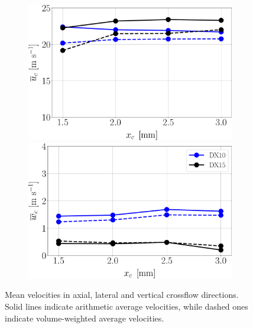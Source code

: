 \begin{figure}[h!]
\flushleft
\begin{subfigure}[b]{1.0\textwidth}
	\flushleft
   \includegraphics[scale=0.25]{./part3_applications/figures_ch8_resolved/SPRAY_characterization/velocities/ux_mean}
   \hspace*{0.2in}
   \includegraphics[scale=0.25]{./part3_applications/figures_ch8_resolved/SPRAY_characterization/velocities/uz_mean}
\end{subfigure}
	\vspace*{-0.2in}
   \caption[Sampled mean liquid velocities for all cases]{Mean velocities in axial, lateral and vertical crossflow directions. Solid lines indicate arithmetic average velocities, while dashed ones indicate volume-weighted average velocities.}
\label{fig:ch8_jicf_liquid_mean_velocities_with_x}
\end{figure}



